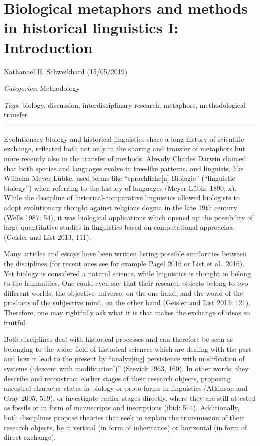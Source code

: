 \documentclass[
  a4paper,
  14pt,
  oneside,
  tablecaptionabove
]{scrbook}
\begin{document}
\newpage
\section*{Biological metaphors and methods in historical linguistics I:
Introduction}

Nathanael E. Schweikhard  (15/05/2019)

\emph{Categories}: Methodology

\emph{Tags}: biology, discussion, interdisciplinary research, metaphors,
methodological transfer

\begin{center}\rule{0.5\linewidth}{1pt}\end{center}


Evolutionary biology and historical linguistics share a long history of
scientific exchange, reflected both not only in the sharing and transfer
of metaphors but more recently also in the transfer of methods. Already
Charles Darwin claimed that both species and languages evolve in
tree-like patterns, and linguists, like Wilhelm Meyer-Lübke, used terms
like \enquote{sprachliche{[}n{]} Biologie} (\enquote{linguistic
biology}) when referring to the history of languages (Meyer-Lübke 1890,
x). While the discipline of historical-comparative linguistics allowed
biologists to adopt evolutionary thought against religious dogma in the
late 19th century (Wells 1987: 54), it was biological applications which
opened up the possibility of large quantitative studies in linguistics
based on computational approaches (Geisler and List 2013, 111).

Many articles and essays have been written listing possible similarities
between the disciplines (for recent ones see for example Pagel 2016 or
List et al.~2016). Yet biology is considered a natural science, while
linguistics is thought to belong to the humanities. One could even say
that their research objects belong to two different worlds, the
objective universe, on the one hand, and the world of the products of
the subjective mind, on the other hand (Geisler and List 2013: 121).
Therefore, one may rightfully ask what it is that makes the exchange of
ideas so fruitful.

Both disciplines deal with historical processes and can therefore be
seen as belonging to the wider field of historical sciences which are
dealing with the past and how it lead to the present by
\enquote{analyz{[}ing{]} persistence with modification of systems
(\enquote{descent with modification})} (Stevick 1963, 160). In other
words, they describe and reconstruct earlier stages of their research
objects, proposing ancestral character states in biology or proto-forms
in linguistics (Atkinson and Gray 2005, 519), or investigate earlier
stages directly, where they are still attested as fossils or in form of
manuscripts and inscriptions (ibid: 514). Additionally, both disciplines
propose theories that seek to explain the transmission of their research
objects, be it vertical (in form of inheritance) or horizontal (in form
of direct exchange).
\end{document}
